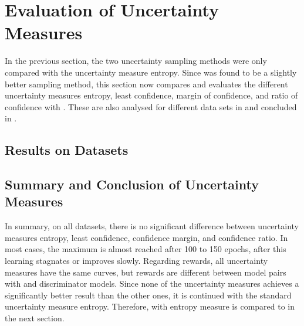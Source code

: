 \section{Evaluation of Uncertainty Measures}
\label{ch:evaluation:sec:evaluation_metrics}
%
In the previous section, the two uncertainty sampling methods were only compared with the uncertainty measure entropy.
Since \ussoftmax was found to be a slightly better sampling method, this section now compares and evaluates the different uncertainty measures entropy, least confidence, margin of confidence, and ratio of confidence with \ussoftmax. 
These are also analysed for different data sets in  and concluded in .
%
\subsection{Results on Datasets} \label{subsec:measures_results}














\subsection{Summary and Conclusion of Uncertainty Measures}
\label{subsec:measure_conclusion}
In summary, on all datasets, there is no significant difference between uncertainty measures entropy, least confidence, confidence margin, and confidence ratio.
In most cases, the maximum is almost reached after 100 to 150 epochs, after this learning stagnates or improves slowly.
Regarding rewards, all uncertainty measures have the same curves, but rewards are different between model pairs with \transe and \transe discriminator models.
Since none of the uncertainty measures achieves a significantly better result than the other ones, it is  continued with the standard uncertainty measure entropy.
Therefore, \ussoftmax with entropy measure is compared to \origsampling in the next section.
\clearpage